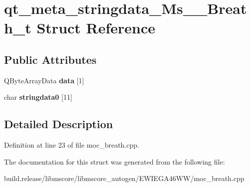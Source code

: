 \hypertarget{structqt__meta__stringdata___ms_____breath__t}{}\section{qt\+\_\+meta\+\_\+stringdata\+\_\+\+Ms\+\_\+\+\_\+\+Breath\+\_\+t Struct Reference}
\label{structqt__meta__stringdata___ms_____breath__t}
\subsection*{Public Attributes}
\begin{DoxyCompactItemize}
\item 
\mbox{\label{structqt__meta__stringdata___ms_____breath__t_aebf5610c2d7bbfcf9dc43d34c1756be5}} 
Q\+Byte\+Array\+Data {\bfseries data} \mbox{[}1\mbox{]}
\item 
\mbox{\label{structqt__meta__stringdata___ms_____breath__t_a249381143c61b73ffe4862bc1258fa80}} 
char {\bfseries stringdata0} \mbox{[}11\mbox{]}
\end{DoxyCompactItemize}


\subsection{Detailed Description}


Definition at line 23 of file moc\+\_\+breath.\+cpp.



The documentation for this struct was generated from the following file\+:\begin{DoxyCompactItemize}
\item 
build.\+release/libmscore/libmscore\+\_\+autogen/\+E\+W\+I\+E\+G\+A46\+W\+W/moc\+\_\+breath.\+cpp\end{DoxyCompactItemize}
